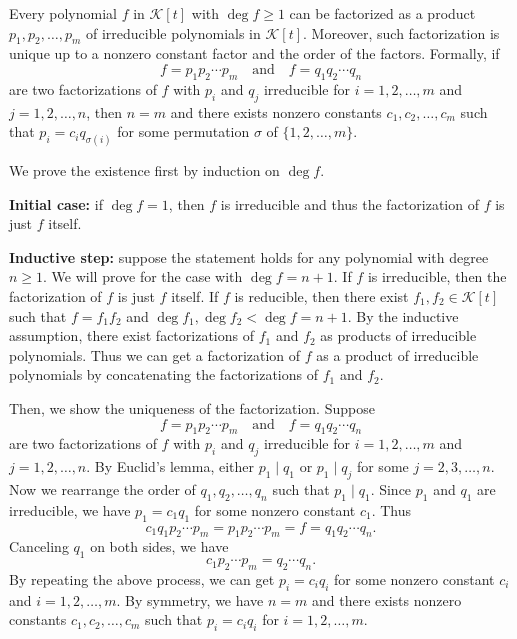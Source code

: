 \begin{theoremenv}
    Every polynomial $f$ in $\mathcal K[t]$ with $\deg f \ge 1$ can be factorized as a product $p_1, p_2, \ldots, p_m$ of irreducible polynomials in $\mathcal K[t]$. Moreover, such factorization is unique up to a nonzero constant factor and the order of the factors. Formally, if $$f = p_1 p_2 \cdots p_m\quad \text{and}\quad f = q_1 q_2 \cdots q_n$$ are two factorizations of $f$ with $p_i$ and $q_j$ irreducible for $i=1,2,\ldots,m$ and $j=1,2,\ldots,n$, then $n=m$ and there exists nonzero constants $c_1, c_2, \ldots, c_m$ such that $p_i = c_i q_{\sigma(i)}$ for some permutation $\sigma$ of $\{ 1, 2, \ldots, m \}$.
\end{theoremenv}
\begin{proofenv}
    We prove the existence first by induction on $\deg f$.

    \textbf{Initial case:} if $\deg f = 1$, then $f$ is irreducible and thus the factorization of $f$ is just $f$ itself.

    \textbf{Inductive step:} suppose the statement holds for any polynomial with degree $n\ge 1$. We will prove for the case with $\deg f = n+1$. If $f$ is irreducible, then the factorization of $f$ is just $f$ itself. If $f$ is reducible, then there exist $f_1, f_2 \in \mathcal K[t]$ such that $f = f_1 f_2$ and $\deg f_1, \deg f_2 < \deg f = n+1$. By the inductive assumption, there exist factorizations of $f_1$ and $f_2$ as products of irreducible polynomials. Thus we can get a factorization of $f$ as a product of irreducible polynomials by concatenating the factorizations of $f_1$ and $f_2$.

    Then, we show the uniqueness of the factorization. Suppose
    $$ f = p_1 p_2 \cdots p_m\quad \text{and}\quad f = q_1 q_2 \cdots q_n $$
    are two factorizations of $f$ with $p_i$ and $q_j$ irreducible for $i=1,2,\ldots,m$ and $j=1,2,\ldots,n$. By Euclid's lemma, either $p_1 \mid q_1$ or $p_1 \mid q_j$ for some $j=2,3,\ldots,n$. Now we rearrange the order of $q_1, q_2, \ldots, q_n$ such that $p_1 \mid q_1$. Since $p_1$ and $q_1$ are irreducible, we have $p_1 = c_1 q_1$ for some nonzero constant $c_1$. Thus
    $$ c_1 q_1 p_2 \cdots p_m = p_1 p_2 \cdots p_m = f = q_1 q_2 \cdots q_n. $$
    Canceling $q_1$ on both sides, we have
    $$ c_1 p_2 \cdots p_m = q_2 \cdots q_n. $$
    By repeating the above process, we can get $p_i = c_i q_i$ for some nonzero constant $c_i$ and $i=1,2,\ldots,m$. By symmetry, we have $n=m$ and there exists nonzero constants $c_1, c_2, \ldots, c_m$ such that $p_i = c_i q_i$ for $i=1,2,\ldots,m$.
\end{proofenv}
